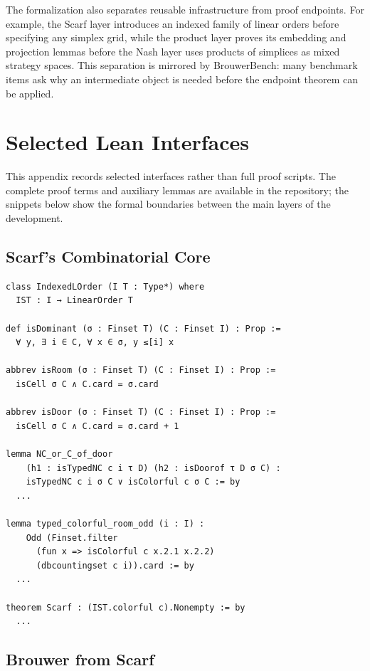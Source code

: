 \documentclass{article}
\theoremstyle{definition}
\begin{document}
The formalization also separates reusable infrastructure from proof endpoints. For example, the Scarf layer introduces an indexed family of linear orders before specifying any simplex grid, while the product layer proves its embedding and projection lemmas before the Nash layer uses products of simplices as mixed strategy spaces. This separation is mirrored by BrouwerBench: many benchmark items ask why an intermediate object is needed before the endpoint theorem can be applied.


\section{Selected Lean Interfaces}
\label{app:selected-interfaces}

This appendix records selected interfaces rather than full proof scripts. The complete proof terms and auxiliary lemmas are available in the repository; the snippets below show the formal boundaries between the main layers of the development.

\subsection{Scarf's Combinatorial Core}

\begin{lstlisting}[caption={Representative interfaces for indexed orders, dominance, and Scarf's theorem.},label={lst:app-scarf-interface}]
class IndexedLOrder (I T : Type*) where
  IST : I → LinearOrder T

def isDominant (σ : Finset T) (C : Finset I) : Prop :=
  ∀ y, ∃ i ∈ C, ∀ x ∈ σ, y ≤[i] x

abbrev isRoom (σ : Finset T) (C : Finset I) : Prop :=
  isCell σ C ∧ C.card = σ.card

abbrev isDoor (σ : Finset T) (C : Finset I) : Prop :=
  isCell σ C ∧ C.card = σ.card + 1

lemma NC_or_C_of_door
    (h1 : isTypedNC c i τ D) (h2 : isDoorof τ D σ C) :
    isTypedNC c i σ C ∨ isColorful c σ C := by
  ...

lemma typed_colorful_room_odd (i : I) :
    Odd (Finset.filter
      (fun x => isColorful c x.2.1 x.2.2)
      (dbcountingset c i)).card := by
  ...

theorem Scarf : (IST.colorful c).Nonempty := by
  ...
\end{lstlisting}

\subsection{Brouwer from Scarf}
\end{document}
